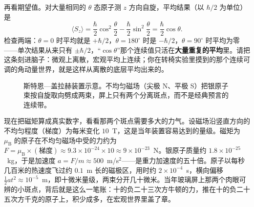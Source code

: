 再看期望值。对大量相同的 $\theta$ 态原子测 $z$ 方向自旋，平均结果（以 $\hbar/2$ 为单位）是
\[
\langle S_z\rangle=\frac{\hbar}{2}\cos^{2}\frac{\theta}{2}-\frac{\hbar}{2}\sin^{2}\frac{\theta}{2}
=\frac{\hbar}{2}\cos\theta .
\]
检查两端：$\theta=0$ 时平均就是 $+\hbar/2$，$\theta=180^\circ$ 时是 $-\hbar/2$，$\theta=90^\circ$ 时平均为零——单次结果从来只有 $\pm\hbar/2$，“$\cos\theta$”那个连续值只活在\textbf{大量重复的平均}里。请把这条刻进脑子：微观上离散，宏观平均上连续；你在转椅实验里摸到的那个连续可调的角动量世界，就是这样从离散的底层平均出来的。

\begin{figure}[htbp]
\centering
{}
\caption{斯特恩—盖拉赫装置示意。不均匀磁场（尖极 N、平极 S）把银原子束按自旋取向劈成两束，屏上只有两个分离斑点，而不是经典预言的连续带。}
\end{figure}

现在把磁矩算成真实数字，看看那两个斑点需要多大的力气。设磁场沿竖直方向的不均匀程度（梯度）为每米变化 $10$~T，这是当年装置容易达到的量级。磁矩为 $\mu_{\mathrm B}$ 的原子在不均匀磁场中受的力约为 $F=\mu_{\mathrm B}\times(\text{梯度})\approx9.3\times10^{-24}\times10\approx9\times10^{-23}$~N。银原子质量约 $1.8\times10^{-25}$~kg，于是加速度 $a=F/m\approx500$~m/s$^2$——是重力加速度的五十倍。原子以每秒几百米的热速度飞过约 $0.1$~m 长的磁极区，用时约 $2\times10^{-4}$~s，横向偏移 $\tfrac12 a t^{2}\approx10^{-5}$~m，即十微米量级，两束分开几十微米。当年玻璃屏上那两个肉眼可辨的小斑点，背后就是这么一笔账：十的负二十三次方牛顿的力，推在十的负二十五次方千克的原子上，积少成多，在宏观世界里盖了章。

